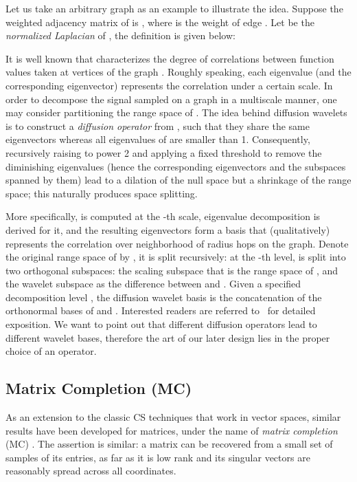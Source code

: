\documentclass[conference]{IEEEtran}
\begin{document}
    Let us take an arbitrary graph  as an example to illustrate the idea. Suppose the weighted adjacency matrix of  is , where  is the weight of edge . Let  be the \textit{normalized Laplacian} of , the definition is given below:
    
It is well known that  characterizes the degree of correlations between function values taken at vertices of the graph  \cite{Chung97}. Roughly speaking, each eigenvalue (and the corresponding eigenvector) represents the correlation under a certain scale. In order to decompose the signal sampled on a graph in a multiscale manner, one may consider partitioning the range space of . The idea behind diffusion wavelets is to construct a \textit{diffusion operator}  from , such that they share the same eigenvectors whereas all eigenvalues of  are smaller than 1. Consequently, recursively raising  to power 2 and applying a fixed threshold to remove the diminishing eigenvalues (hence the corresponding eigenvectors and the subspaces spanned by them) lead to a  dilation of the null space but a shrinkage of the range space; this naturally produces space splitting.

    More specifically,  is computed at the -th scale, eigenvalue decomposition is derived for it, and the resulting eigenvectors form a basis that (qualitatively) represents the correlation over neighborhood of radius  hops on the graph. Denote the original range space of  by , it is split recursively: at the -th level,  is split into two orthogonal subspaces: the scaling subspace  that is the range space of , and the wavelet subspace  as the difference between  and . Given a specified decomposition level , the diffusion wavelet basis  is the concatenation of the orthonormal bases of  and . Interested readers are referred to~\cite{CoifmanM-04} for detailed exposition. We want to point out that different diffusion operators lead to different wavelet bases, therefore the art of our later design lies in the proper choice of an operator.

  \subsection{Matrix Completion (MC)} \label{sec:mc}
As an extension to the classic CS techniques that work in vector spaces, similar results have been developed for matrices, under the name of \textit{matrix completion} (MC) \cite{CandesP-ProcIEEE10}. The assertion is similar: a matrix can be recovered from a small set of samples of its entries, as far as it is low rank and its singular vectors are reasonably spread across all coordinates.
\end{document}
